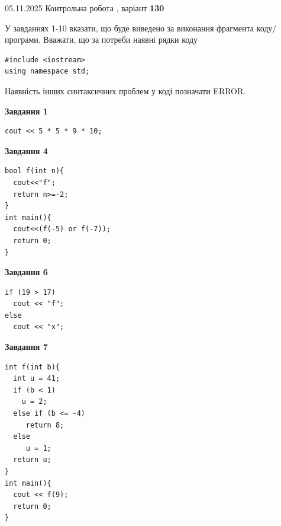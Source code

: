 \documentclass[12pt, ukrainian]{article}
\begin{document}
\newpage

{\Large{05.11.2025 Контрольна робота , варіант  \No \textbf { 130 }\par}}
{
\begin {large}
У завданнях 1-10 вказати, що буде виведено за виконання фрагмента коду/про\-гра\-ми.
Вважати, що за потреби наявні рядки коду
\begin{verbatim}
#include <iostream>
using namespace std;
\end{verbatim}
Наявність інших синтаксичних проблем у коді позначати ERROR.

\begin{minipage}[t]{7.0cm}

\begin{center}
\textbf{Завдання 1}
\end{center}
\vspace{-8mm}

\begin{verbatim}
cout << 5 * 5 * 9 * 10;
\end{verbatim}



\begin{center}
\textbf{Завдання 4}
\end{center}
\vspace{-8mm}

\begin{verbatim}
bool f(int n){
  cout<<"f";
  return n>=-2;
}
int main(){
  cout<<(f(-5) or f(-7));
  return 0;
}
\end{verbatim}



\begin{center}
\textbf{Завдання 6}
\end{center}
\vspace{-8mm}

\begin{verbatim}
if (19 > 17)
  cout << "f";
else
  cout << "x";
\end{verbatim}



\begin{center}
\textbf{Завдання 7}
\end{center}
\vspace{-8mm}

\begin{verbatim}
int f(int b){
  int u = 41;
  if (b < 1)
    u = 2;
  else if (b <= -4)
     return 8;
  else
     u = 1;
  return u;
}
int main(){
  cout << f(9);
  return 0;
}
\end{verbatim}


\end{minipage}
\end{large}}
\end{document}
